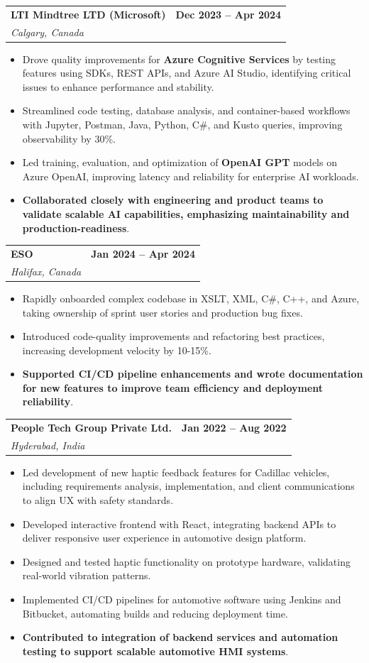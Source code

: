 \documentclass[letterpaper,11pt]{article}
\makeatletter
\newcommand{\resumeItem}[1]{
  \item\small{
    {#1 \vspace{-2pt}}
  }
}
\newcommand{\resumeSubheading}[4]{
  \vspace{-2pt}\item
    \begin{tabular*}{1.0\textwidth}[t]{l@{\extracolsep{\fill}}r}
      \textbf{#1} & \textbf{\small #2} \\
      \textit{\small#3} & \textit{\small #4} \\
    \end{tabular*}\vspace{-7pt}
}
\newcommand{\resumeItemListStart}{\begin{itemize}}
\newcommand{\resumeItemListEnd}{\end{itemize}\vspace{-5pt}}
\makeatother
\begin{document}
    \resumeSubheading
      {\textbf{LTI Mindtree LTD (Microsoft)}}{\textbf{Dec 2023 -- Apr 2024}}
      {Calgary, Canada}{}
      \resumeItemListStart
        \resumeItem{Drove quality improvements for \textbf{Azure Cognitive Services} by testing features using SDKs, REST APIs, and Azure AI Studio, identifying critical issues to enhance performance and stability.}
        \resumeItem{Streamlined code testing, database analysis, and container-based workflows with Jupyter, Postman, Java, Python, C\#, and Kusto queries, improving observability by 30\%.}
        \resumeItem{Led training, evaluation, and optimization of \textbf{OpenAI GPT} models on Azure OpenAI, improving latency and reliability for enterprise AI workloads.}
        \resumeItem{\textbf{Collaborated closely with engineering and product teams to validate scalable AI capabilities, emphasizing maintainability and production-readiness}.}
      \resumeItemListEnd
    
    \resumeSubheading
      {\textbf{ESO}}{\textbf{Jan 2024 -- Apr 2024}}
      {Halifax, Canada}{}
      \resumeItemListStart
        \resumeItem{Rapidly onboarded complex codebase in XSLT, XML, C\#, C++, and Azure, taking ownership of sprint user stories and production bug fixes.}
        \resumeItem{Introduced code-quality improvements and refactoring best practices, increasing development velocity by 10-15\%.}
        \resumeItem{\textbf{Supported CI/CD pipeline enhancements and wrote documentation for new features to improve team efficiency and deployment reliability}.}
      \resumeItemListEnd

    \resumeSubheading
      {\textbf{People Tech Group Private Ltd.}}{\textbf{Jan 2022 -- Aug 2022}}
      {Hyderabad, India}{}
      \resumeItemListStart
        \resumeItem{Led development of new haptic feedback features for Cadillac vehicles, including requirements analysis, implementation, and client communications to align UX with safety standards.}
        \resumeItem{Developed interactive frontend with React, integrating backend APIs to deliver responsive user experience in automotive design platform.}
        \resumeItem{Designed and tested haptic functionality on prototype hardware, validating real-world vibration patterns.}
        \resumeItem{Implemented CI/CD pipelines for automotive software using Jenkins and Bitbucket, automating builds and reducing deployment time.}
        \resumeItem{\textbf{Contributed to integration of backend services and automation testing to support scalable automotive HMI systems}.}
      \resumeItemListEnd
\end{document}
